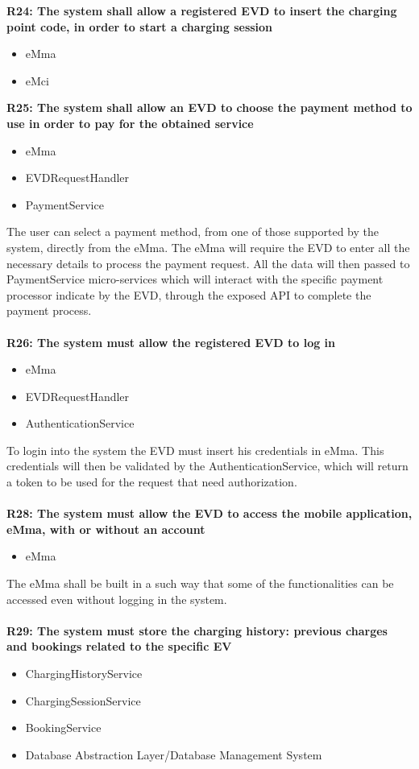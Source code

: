 \textbf{R24: The system shall allow a registered EVD to insert the charging point code, in order to start a charging session}
\begin{itemize}
	\item eMma
	\item eMci
\end{itemize}

\textbf{R25: The system shall allow an EVD to choose the payment method to use in order to pay for the obtained service}
\begin{itemize}
	\item eMma
	\item EVDRequestHandler
	\item PaymentService
\end{itemize}
The user can select a payment method, from one of those supported by the system, directly from the eMma. The eMma will require the EVD to enter all the necessary details to process the payment request. All the data will then passed to PaymentService micro-services which will interact with the specific payment processor indicate by the EVD, through the exposed API to complete the payment process.\\\\
\textbf{R26: The system must allow the registered EVD to log in}
\begin{itemize}
	\item eMma
	\item EVDRequestHandler
	\item AuthenticationService
\end{itemize}
To login into the system the EVD must insert his credentials in eMma. This credentials will then be validated by the AuthenticationService, which will return a token to be used for the request that need authorization.\\\\
\textbf{R28: The system must allow the EVD to access the mobile application, eMma, with or without an account}
\begin{itemize}
	\item eMma
\end{itemize}
The eMma shall be built in a such way that some of the functionalities can be accessed even without logging in the system.\\\\
\textbf{R29: The system must store the charging history: previous charges and bookings related to the specific EV}
\begin{itemize}
	\item ChargingHistoryService
        \item ChargingSessionService
        \item BookingService
	\item Database Abstraction Layer/Database Management System
\end{itemize}
